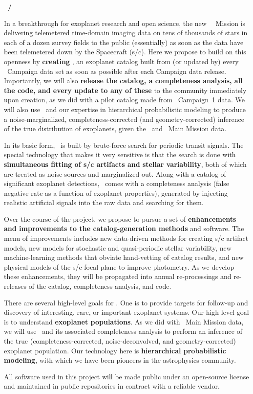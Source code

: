 \documentclass[12pt]{article}
\begin{document}
\noindent\textbf{\shortauthor~/~\fulltitle}
\bigskip

In a breakthrough for exoplanet research and open science, the new
\kepler\ \ketu\ Mission is delivering telemetered time-domain imaging
data on tens of thousands of stars in each of a dozen survey fields to
the public (essentially) as soon as the data have been telemetered
down by the Spacecraft (s/c).
Here we propose to build on this openness by \textbf{creating
  \thecatalog}, an exoplanet catalog built from (or updated by)
every \ketu\ Campaign data set as soon as possible after each Campaign
data release.
Importantly, we will also \textbf{release the catalog, a completeness
  analysis, all the code, and every update to any of these} to the
community immediately upon creation, as we did with a pilot catalog
made from \ketu\ Campaign~1 data.
We will also use \thecatalog\ and our expertise in hierarchical
probabilistic modeling to produce a noise-marginalized,
completeness-corrected (and geometry-corrected) inference of the true
distribution of exoplanets, given the \ketu\ and \kepler\ Main Mission
data.

In its basic form, \thecatalog\ is built by brute-force search for
periodic transit signals.
The special technology that makes it very sensitive is that the search
is done with \textbf{simultaneous fitting of s/c artifacts and stellar
variability}, both of which are treated as noise sources and
marginalized out.
Along with a catalog of significant exoplanet detections,
\thecatalog\ comes with a completeness analysis (false negative rate
as a function of exoplanet properties), generated by injecting
realistic artificial signals into the raw data and searching for them.

Over the course of the project, we propose to pursue a set of
\textbf{enhancements and improvements to the catalog-generation methods} and
software.
The menu of improvements includes new data-driven methods for creating
s/c artifact models, new models for stochastic and quasi-periodic
stellar variability, new machine-learning methods that obviate
hand-vetting of catalog results, and new physical models of the s/c
focal plane to improve photometry.
As we develop these enhancements, they will be propagated into annual
re-processings and re-releases of the catalog, completeness analysis,
and code.

There are several high-level goals for \thecatalog.
One is to provide targets for follow-up and discovery of interesting,
rare, or important exoplanet systems.
Our high-level goal is to understand \textbf{exoplanet populations}.
As we did with \kepler\ Main Mission data, we will use
\thecatalog\ and its associated completeness analysis to perform an
inference of the true (completeness-corrected, noise-deconvolved, and
geometry-corrected) exoplanet population.
Our technology here is \textbf{hierarchical probabilistic modeling},
with which we have been pioneers in the astrophysics community.

All software used in this project will be made public under an
open-source license and maintained in public  repositories in
contract with a reliable vendor.
\end{document}
